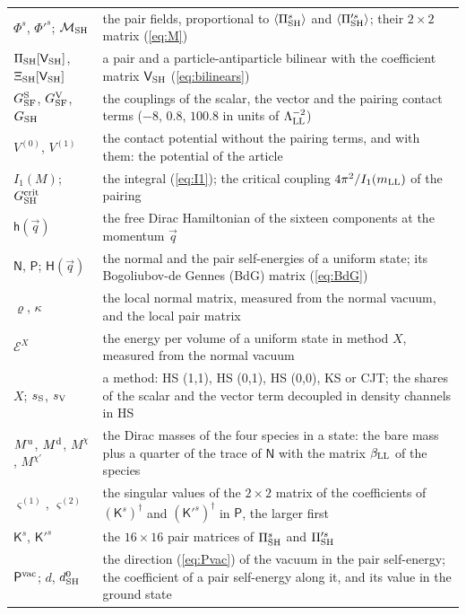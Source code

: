 \documentclass[aps,prd,onecolumn,superscriptaddress,nofootinbib,floatfix,longbibliography]{revtex4-2}
\newcommand{\LL}{{\rm LL}}
\newcommand{\SF}{{\rm SF}}
\newcommand{\SH}{{\rm SH}}
\begin{document}
\begin{longtable}{p{}p{}}
$\Phi^s$, $\Phi'^s$; $\mathcal M_\SH$ & the pair fields, proportional to $\langle\Pi^s_\SH\rangle$ and $\langle\Pi'^s_\SH\rangle$; their $2\times2$ matrix (\ref{eq:M}) \\
$\Pi_\SH[\mathsf V_\SH]$, $\Xi_\SH[\mathsf V_\SH]$ & a pair and a particle-antiparticle bilinear with the coefficient matrix $\mathsf V_\SH$ (\ref{eq:bilinears}) \\
$G^{\rm S}_\SF$, $G^{\rm V}_\SF$, $G_\SH$ & the couplings of the scalar, the vector and the pairing contact terms ($-8$, $0.8$, $100.8$ in units of $\Lambda_\LL^{-2}$) \\
$V^{(0)}$, $V^{(1)}$ & the contact potential without the pairing terms, and with them: the potential of the article \\
$I_1(M)$; $G^{\rm crit}_\SH$ & the integral (\ref{eq:I1}); the critical coupling $4\pi^2/I_1(m_\LL)$ of the pairing \\
$\mathsf h(\vec q)$ & the free Dirac Hamiltonian of the sixteen components at the momentum $\vec q$ \\
$\mathsf N$, $\mathsf P$; $\mathsf H(\vec q)$ & the normal and the pair self-energies of a uniform state; its Bogoliubov-de Gennes (BdG) matrix (\ref{eq:BdG}) \\
$\varrho$, $\kappa$ & the local normal matrix, measured from the normal vacuum, and the local pair matrix \\
$\mathcal E^X$ & the energy per volume of a uniform state in method $X$, measured from the normal vacuum \\
$X$; $s_{\rm S}$, $s_{\rm V}$ & a method: HS (1,1), HS (0,1), HS (0,0), KS or CJT; the shares of the scalar and the vector term decoupled in density channels in HS \\
$M^{\rm u}$, $M^{\rm d}$, $M^\chi$, $M^{\chi'}$ & the Dirac masses of the four species in a state: the bare mass plus a quarter of the trace of $\mathsf N$ with the matrix $\beta_\LL$ of the species \\
$\varsigma^{(1)}$, $\varsigma^{(2)}$ & the singular values of the $2\times2$ matrix of the coefficients of $(\mathsf K^s)^\dagger$ and $(\mathsf K'^s)^\dagger$ in $\mathsf P$, the larger first \\
$\mathsf K^s$, $\mathsf K'^s$ & the $16\times16$ pair matrices of $\Pi^s_\SH$ and $\Pi'^s_\SH$ \\
$\mathsf P^{\rm vac}$; $d$, $d^0_\SH$ & the direction (\ref{eq:Pvac}) of the vacuum in the pair self-energy; the coefficient of a pair self-energy along it, and its value in the ground state \\

\end{longtable}
\end{document}
